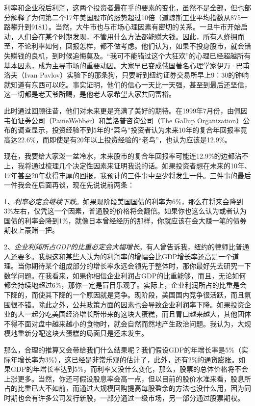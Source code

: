 \documentclass[UTF8,a4paper,zihao=-4,fontset = windows]{ctexart} %
\begin{document}
利率和企业税后利润，这两个投资者最在乎的要素的变化，虽然不是全部，但也部分解释了为何第二个17年美国股市的涨势超过10倍（道琼斯工业平均指数从875一路攀升到9181）。当然，大牛市也与市场心理因素有密切的关系。一旦牛市开始启动，人们会在某个时期发现，不管用什么方法都能赚大钱。因此，所有人蜂拥而至，不论利率如何，回报怎样，都不做考虑。他们认为，如果不投身股市，就会错失赚钱的良机，到时候追悔莫及。“我可不能错过这个大狂欢”的心理已经超越所有基本因素，成为主导市场的重要动因。大家早已变成俄国著名心理学家伊万·巴甫洛夫（Ivan Pavlov）实验下的那条狗，只要听到纽约证券交易所早上9：30的钟响就知道有东西可以吃。事实证明，他们的信心一天比一天强，甚至到最后还坚信，这一切都是老天爷所赐，是他老人家希望大家共同富裕。

此时通过回顾往昔，他们对未来更是充满了美好的期待。在1999年7月份，由佩因韦伯证券公司（PaineWebber）和盖洛普咨询公司（The Gallup Organization）公布的调查显示，投资经验不到5年的“菜鸟”投资者认为未来10年的复合年回报率竟高达22.6\%，而即使是有20年以上投资经验的“老鸟”，也认为应该是12.9\%。

现在，我要给大家泼一盆冷水，未来股市的复合年回报率可能连12.9\%的边都沾不上，我将通过梳理几个决定性因素来证明我说的话。如果投资者想在未来的10年、17年甚至20年获得丰厚的回报，我预计的三件事中至少将发生一件。三件事的最后一件我会在后面再谈，现在先说说前两条：

1、\textit{利率必定会继续下跌}。如果现阶段美国国债的利率为6\%，那么在将来会降到3\%左右，仅凭这一个因素，普通股的价格将会翻倍。如果你也这么认为或者认为国债的利率会降到1\%，就像日本曾经经历的那样，你就应该在会大赚一笔的债券期权上豪赌一把。

2、\textit{企业利润所占GDP的比重必定会大幅增长}。有人曾告诉我，纽约的律师比普通人还要多。我想这和某些人认为的利润率的增幅会比GDP增长率还高是一个道理。当你期待某个组成部分的增长率永远会领先于整体时，那你最好先去研究一下数学问题。在我看来，如果你相信企业利润占GDP的比重能够，而且，无论如何都会持续地超过6\%，那你一定是盲目乐观了。实际上，企业利润所占的比重是会下降的，而使其下降的一个原因就是竞争。现阶段，美国国内竞争很活跃，而且氛围很不错。除此之外，公共政策方面的因素也会导致企业利润率下降。如果投资企业的人一起分吃美国经济增长所带来的这块大蛋糕，而且胃口越来越大，其他团体不得不面对盘中越来越小的食物时，就会自然而然地产生政治问题。我认为，大规模地重新分配这块大蛋糕的局面只是还未发生。

那么，合理的推算又会带给我们什么结果呢？我们假设GDP的年增长率是5\%（实际年增长率为3\%），这已经是非常乐观的估计了，此外，还有2\%的通货膨胀。如果GDP的年增长率达到5\%，而利率又没什么变化，那么，股票的总体价格将不会上涨更多。当然，你还可假设股息率会高一点，但以目前的股价水准来看，股息所占的比重已大不如前，而通过大规模回购提高每股盈余的方法也没什么用，因为同时期也会有许多公司发行新股，一部分通过一级市场，另一部分通过股票期权。
\end{document}
